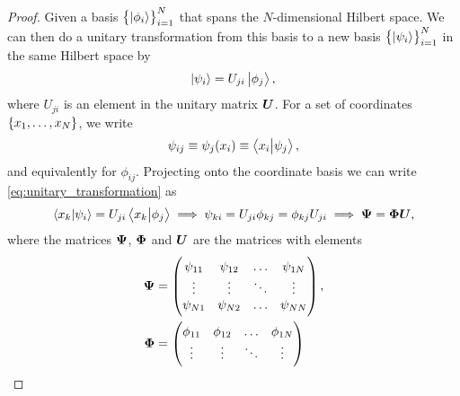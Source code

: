             \begin{proof}
                \label{proof:slater_determinants_invariant}
                Given a basis $\left\{ \ket{\phi_i} \right\}_{i = 1}^{N}$ that spans the
                $N$-dimensional Hilbert space. We can then do a unitary
                transformation from this basis to a new basis
                $\left\{ \ket{\psi_i} \right\}_{i = 1}^{N}$ in the same Hilbert space by
                \begin{align}
                    \ket{\psi_i} = U_{ji}\ket{\phi_j},
                    \label{eq:unitary_transformation}
                \end{align}
                where $U_{ji}$ is an element in the unitary matrix $\boldsymbol{U}$.
                For a set of coordinates
                $\left\{ x_1, \dots, x_N \right\}$, we write
                \begin{align}
                    \psi_{ij} \equiv \psi_j(x_i)
                    \equiv \braket{x_i}{\psi_j},
                \end{align}
                and equivalently for $\phi_{ij}$. Projecting onto the coordinate
                basis we can write \autoref{eq:unitary_transformation} as
                \begin{gather}
                    \braket{x_k}{\psi_i}
                    = U_{ji}\braket{x_k}{\phi_j}
                    \implies
                    \psi_{ki} = U_{ji}\phi_{kj} = \phi_{kj}U_{ji}
                    \implies \boldsymbol{\Psi} = \boldsymbol{\Phi}\boldsymbol{U},
                \end{gather}
                where the matrices $\boldsymbol{\Psi}$, $\boldsymbol{\Phi}$ and $\boldsymbol{U}$ are
                the matrices with elements
                \begin{align}
                    \boldsymbol{\Psi}
                    &= \begin{pmatrix}
                        \psi_{11} & \psi_{12} & \dots & \psi_{1N} \\
                        \vdots & \vdots & \ddots & \vdots \\
                        \psi_{N1} & \psi_{N2} & \dots & \psi_{NN}
                    \end{pmatrix}, \\
                    \boldsymbol{\Phi}
                    &= \begin{pmatrix}
                        \phi_{11} & \phi_{12} & \dots & \phi_{1N} \\
                        \vdots & \vdots & \ddots & \vdots \\

\end{pmatrix}
\end{align}
\end{proof}
